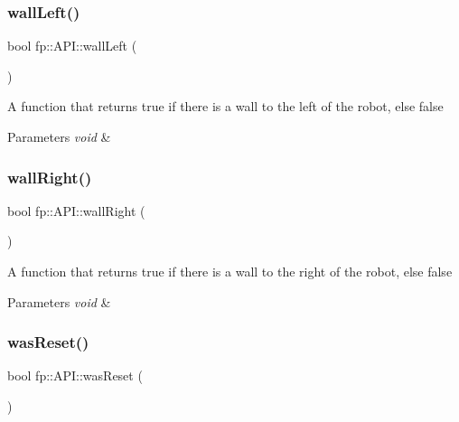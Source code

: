 \subsubsection{\texorpdfstring{wall\+Left()}{wallLeft()}}
{\footnotesize\ttfamily bool fp\+::\+A\+P\+I\+::wall\+Left (\begin{DoxyParamCaption}{ }\end{DoxyParamCaption})\hspace{0.3cm}{\ttfamily [static]}}

A function that returns true if there is a wall to the left of the robot, else false 
\begin{DoxyParams}{Parameters}
{\em void} & \\
\hline
\end{DoxyParams}
\mbox{\label{classfp_1_1_a_p_i_aeaebbd3b022bc0ed768dc3112ea1db94}} 
\subsubsection{\texorpdfstring{wall\+Right()}{wallRight()}}
{\footnotesize\ttfamily bool fp\+::\+A\+P\+I\+::wall\+Right (\begin{DoxyParamCaption}{ }\end{DoxyParamCaption})\hspace{0.3cm}{\ttfamily [static]}}

A function that returns true if there is a wall to the right of the robot, else false 
\begin{DoxyParams}{Parameters}
{\em void} & \\
\hline
\end{DoxyParams}
\mbox{\label{classfp_1_1_a_p_i_a390976eee05262068b7387f1421d906a}} 
\subsubsection{\texorpdfstring{was\+Reset()}{wasReset()}}
{\footnotesize\ttfamily bool fp\+::\+A\+P\+I\+::was\+Reset (\begin{DoxyParamCaption}{ }\end{DoxyParamCaption})\hspace{0.3cm}{\ttfamily [static]}}

